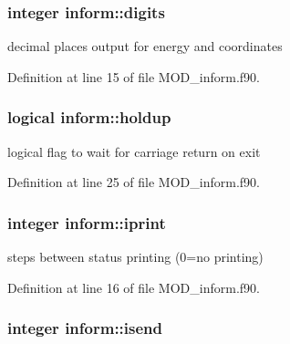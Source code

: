 \hypertarget{classinform_aaae7c125e88d55b253fcc1e2dc739afa}{
\subsubsection[{digits}]{\setlength{\rightskip}{0pt plus 5cm}integer inform\-::digits}}\label{classinform_aaae7c125e88d55b253fcc1e2dc739afa}


decimal places output for energy and coordinates 



Definition at line 15 of file M\-O\-D\-\_\-inform.\-f90.

\hypertarget{classinform_a4178ee8299689a2c8c3067ea907dc969}{
\subsubsection[{holdup}]{\setlength{\rightskip}{0pt plus 5cm}logical inform\-::holdup}}\label{classinform_a4178ee8299689a2c8c3067ea907dc969}


logical flag to wait for carriage return on exit 



Definition at line 25 of file M\-O\-D\-\_\-inform.\-f90.

\hypertarget{classinform_a1b1e50686de5b348cbbaa1894c4e9845}{
\subsubsection[{iprint}]{\setlength{\rightskip}{0pt plus 5cm}integer inform\-::iprint}}\label{classinform_a1b1e50686de5b348cbbaa1894c4e9845}


steps between status printing (0=no printing) 



Definition at line 16 of file M\-O\-D\-\_\-inform.\-f90.

\hypertarget{classinform_a7002c7078c40e14db755e7c251e77ef2}{
\subsubsection[{isend}]{\setlength{\rightskip}{0pt plus 5cm}integer inform\-::isend}}\label{classinform_a7002c7078c40e14db755e7c251e77ef2}


